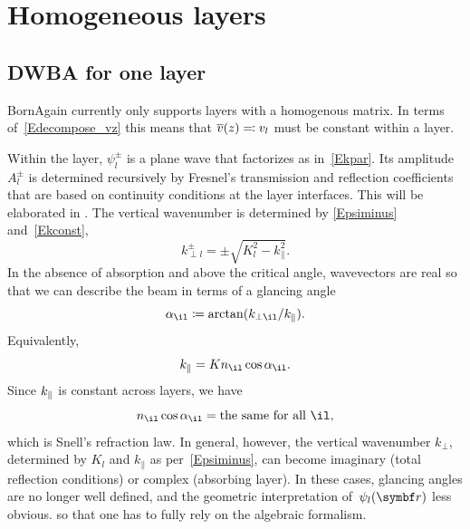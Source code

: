 \section{Homogeneous layers}\label{SLayHomo}

\subsection{DWBA for one layer}\label{SStep}

BornAgain currently only supports layers with a homogenous matrix.
In terms of~\cref{Edecompose_vz} this means that
$\overline{v}(z)\eqqcolon v_l$ must be constant within a layer.

Within the layer, $\psi^\pm_l$ is a plane wave
that factorizes as in~\cref{Ekpar}.
Its amplitude~$A_l^\pm$ is determined recursively
by Fresnel's transmission and reflection coefficients
%
that are based on continuity conditions at the layer interfaces.
This will be elaborated in .
%
%
The vertical wavenumber is determined by \cref{Epsiminus} and~\cref{Ekconst},
\begin{equation}\label{Ekperpl}
  k_{\perp l}^\pm = \pm\sqrt{K_l^2 - k_\parallel^2}.
\end{equation}
In the absence of absorption and above the critical angle,
wavevectors are real
so that we can describe the beam in terms of a glancing angle
\begin{equation}\label{Edef_alpha}
  \alpha_{\il}\coloneqq \arctan(k_{\perp \il}/k_{\plll}).
\end{equation}
Equivalently,
\begin{equation}\label{Ekplllncos}
  k_{\plll}=K n_\il \cos\alpha_{\il}.
\end{equation}
Since $k_{\parallel}$ is constant across layers,
we have
\begin{equation}\label{ESnell}
  n_\il \cos\alpha_{\il} = \text{the same for all }\il,
\end{equation}
which is Snell's refraction law.
In general, however, the vertical wavenumber $k_{\perp}$,
determined by $K_l$ and $k_\parallel$ as per~\cref{Epsiminus},
can become imaginary (total reflection conditions) or complex (absorbing layer).
%
In these cases, glancing angles are no longer well defined,
and the geometric interpretation of~$\psi_l(\r)$ less obvious.
so that one has to fully rely on the algebraic formalism.


